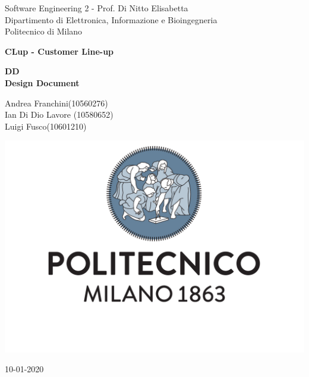 \documentclass[a4paper]{article}
\begin{document}
\begin{titlepage}
	\centering
    
    {\normalsize 
        Software Engineering 2 - Prof. Di Nitto Elisabetta \\ 
		Dipartimento di Elettronica, Informazione e Bioingegneria \\
        Politecnico di Milano \par
    }     \vspace{3cm}

    {\Huge \textbf{CLup - Customer Line-up\\} }    \vspace{1cm}
  
    {\large \textbf{DD\\Design Document} \par}     \vspace{4cm}

	{\normalsize Andrea Franchini(10560276) \\ Ian Di Dio Lavore (10580652)\\ Luigi Fusco(10601210)\par}     \vspace{3cm}

    \includegraphics[scale=0.4]{images/logo.pdf}
    \vspace{0.5cm}

    
	{\normalsize 10-01-2020 \par}
	
\end{titlepage}

\tableofcontents

    
    
    
    
    
    
    

    
\end{document}
